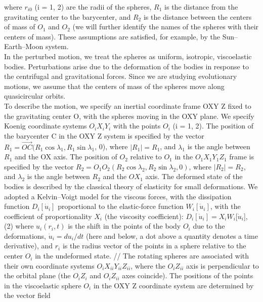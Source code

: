 \documentclass[12pt]{article}
\begin{document}
\begin{multicols}{2}
where $r_{i0}$ (i = 1, 2) are the radii of the spheres, $R_{1}$
is the distance from the gravitating center to the
barycenter, and $R_{2}$ is the distance between the centers
of mass of $O_{1}$ and $O_{2}$ (we will further identify
the names of the spheres with their centers of mass).
These assumptions are satisfied, for example, by the
Sun–Earth–Moon system.\\
In the perturbed motion, we treat the spheres as
uniform, isotropic, viscoelastic bodies. Perturbations
arise due to the deformation of the bodies in response
to the centrifugal and gravitational forces. Since we
are studying evolutionary motions, we assume that
the centers of mass of the spheres move along quasicircular
orbits.\\
To describe the motion, we specify an inertial
coordinate frame OXY Z fixed to the gravitating
center O, with the spheres moving in the OXY
plane. We specify Koenig coordinate systems ${O_i}{X_i}{Y_i}$
with the points ${O_i}$ (i = 1, 2). The position of the barycenter C in the OXY Z system is specified by
the vector ${R_1} = \vec{OC} ({R_1} \cos {\lambda_1}, {R_1} \sin {\lambda_1}$, 0), where
$|{R_1}| = {R_1}$, and ${\lambda_1}$ is the angle between ${R_1}$ and the
OX axis. The position of ${O_2}$ relative to ${O_1}$ in the
${O_1}{X_1}{Y_1}{Z_1}$ frame is specified by the vector ${R_2} = {O_1}{O_2}({R_2} \cos {\lambda_2}, {R_2} \sin {\lambda_2}, 0)$, where 
$|{R_2}| = {R_2}$,  and
${\lambda_2}$ is the angle between ${R_2}$ and the $O{X_1}$ axis. The
deformed state of the bodies is described by the classical
theory of elasticity for small deformations. We
adopted a Kelvin–Voigt model for the viscous forces,
with the dissipation function ${D_i}[{\dot{u}_i}]$ proportional to
the elastic-force function ${W_i}[{\dot{u}_i}]$, with the coefficient
of proportionality ${X_i}$ (the viscosity coefficient):
${D_i}[{\dot{u}_i}] = {X_i}{W_i}[{\dot{u}_i}$], (2)
where ${u_i}({r_i}, t)$ is the shift in the points of the body ${O_i}$
due to the deformations, ${\dot{u}_i} = d{u_i}/dt$ (here and below,
a dot above a quantity denotes a time derivative), and
${r_i}$ is the radius vector of the points in a sphere relative
to the center ${O_i}$ in the undeformed state.
//
The rotating spheres are associated with their own
coordinate systems ${O_i}{X_{ii}}{Y_{ii}}{Z_{ii}}$, where the ${O_i}{Z_{ii}}$ axis
is perpendicular to the orbital plane (the ${O_i}{Z_i}$ and
${O_i}{Z_{ii}}$ axes coincide). The positions of the points in
the viscoelastic sphere ${O_i}$ in the OXY Z coordinate
system are determined by the vector field

\end{multicols}

\thispagestyle{fancy}
\end{document}
